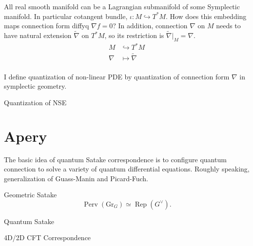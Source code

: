 \documentclass{article}
\begin{document}
\noindent
All real smooth manifold can be a Lagrangian submanifold of some Symplectic manifold. In particular cotangent bundle, 
$\iota: M\hookrightarrow T^*M$. How does this embedding maps connection form diffyq $\nabla f=0$? 
In addition, connection $\nabla$ on $M$ needs to have natural extension $\tilde{\nabla}$ on $T^*M$,
so its restriction is $\tilde{\nabla}|_M =\nabla$.  \\


\begin{equation}
\begin{aligned}
M &\hookrightarrow T^*M \\
\nabla &\mapsto \tilde{\nabla} \\
\end{aligned}
\end{equation}

\noindent
I define quantization of non-linear PDE by quantization of connection form $\nabla$ in symplectic geometry.


\begin{definition}{}{}

\end{definition}



\begin{definition}{Quantization of NSE}{}
\end{definition}






\section {Apery}

\noindent
The basic idea of quantum Satake correspondence is to configure quantum connection to solve a variety of quantum differential equations.
Roughly speaking, generalization of Guass-Manin and Picard-Fuch.


\begin{definition}{Geometric Satake}{}
\[
\operatorname{Perv}(\mathrm{Gr}_G)
\simeq \operatorname{Rep}(G^\vee).
\]
\end{definition}


\begin{definition}{Quantum Satake}{}
\end{definition}


\begin{definition}{4D/2D CFT Correspondence}{}
\end{definition}
\end{document}
